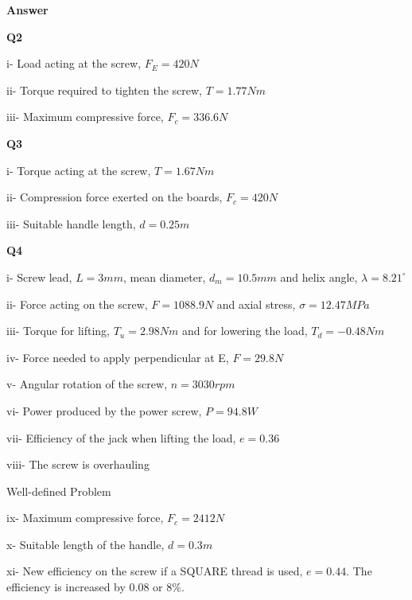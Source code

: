 \documentclass[a4paper, fleqn]{article}
\begin{document}
\newpage

\textbf{Answer}
\vspace{10pt}

\textbf{Q2}

i- Load acting at the screw, $F_E=420N$

ii- Torque required to tighten the screw, $T=1.77Nm$

iii- Maximum compressive force, $F_c=336.6N$

\vspace{10pt}
\textbf{Q3}

i- Torque acting at the screw, $T=1.67Nm$

ii- Compression force exerted on the boards, $F_c=420N$

iii- Suitable handle length, $d=0.25m$

\vspace{10pt}
\textbf{Q4}

i- Screw lead, $L=3mm$, mean diameter, $d_m=10.5mm$ and helix angle, $\lambda=8.21^{\circ}$

ii- Force acting on the screw, $F=1088.9N$ and axial stress, $\sigma=12.47MPa$

iii- Torque for lifting, $T_u=2.98Nm$ and for lowering the load, $T_d=-0.48Nm$

iv- Force needed to apply perpendicular at E, $F=29.8N$

v- Angular rotation of the screw, $n=3030rpm$

vi- Power produced by the power screw, $P=94.8W$

vii- Efficiency of the jack when lifting the load, $e=0.36$

viii- The screw is overhauling

\vspace{10pt}
Well-defined Problem

ix- Maximum compressive force, $F_c=2412N$

x- Suitable length of the handle, $d=0.3m$

xi- New efficiency on the screw if a SQUARE thread is used, $e=0.44$. The efficiency is increased by 0.08 or 8\%.
\end{document}
